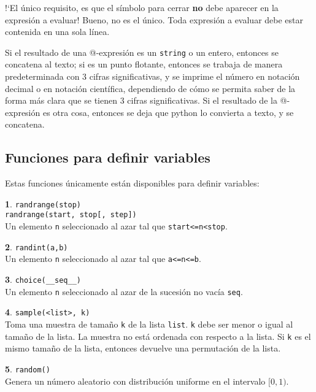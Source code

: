 \documentclass[12pt]{article}
\theoremstyle{definition}
\newtheorem{funcion}{}[section]
\begin{document}
!`El único requisito, es que el símbolo para cerrar \textbf{no} debe aparecer en la expresión a evaluar! Bueno, no es el único. Toda expresión a evaluar debe estar contenida en una sola línea.

Si el resultado de una @-expresión es un \verb|string| o un entero, entonces se concatena al texto; si es un punto flotante, entonces se trabaja de manera predeterminada con 3 cifras significativas, y se imprime el número en notación decimal o en notación científica, dependiendo de cómo se permita saber de la forma más clara que se tienen 3 cifras significativas. Si el resultado de la @-expresión es otra cosa, entonces se deja que python lo convierta a texto, y se concatena.

\subsection{Funciones para definir variables}

Estas funciones únicamente están disponibles para definir variables:

\begin{funcion}
  \verb|randrange(stop)| \\
  \verb|randrange(start, stop[, step])| \\[1ex]
  Un elemento \verb|n| seleccionado al azar tal que \verb|start<=n<stop|.
\end{funcion}

\begin{funcion}
  \verb|randint(a,b)| \\[1ex]
  Un elemento \verb|n| seleccionado al azar tal que \verb|a<=n<=b|.
\end{funcion}

\begin{funcion}
  \verb|choice(__seq__)| \\[1ex]
  Un elemento \verb|n| seleccionado al azar de la sucesión no vacía \verb|seq|.
\end{funcion}

\begin{funcion}
  \verb|sample(<list>, k)| \\[1ex]
  Toma una muestra de tamaño \verb|k| de la lista \verb|list|. \verb|k| debe ser menor o igual al tamaño de la lista. La muestra no está ordenada con respecto a la lista. Si \verb|k| es el mismo tamaño de la lista, entonces devuelve una permutación de la lista.
\end{funcion}

\begin{funcion}
  \verb|random()| \\[1ex]
  Genera un número aleatorio con distribución uniforme en el intervalo $[0, 1)$.
\end{funcion}
\end{document}
